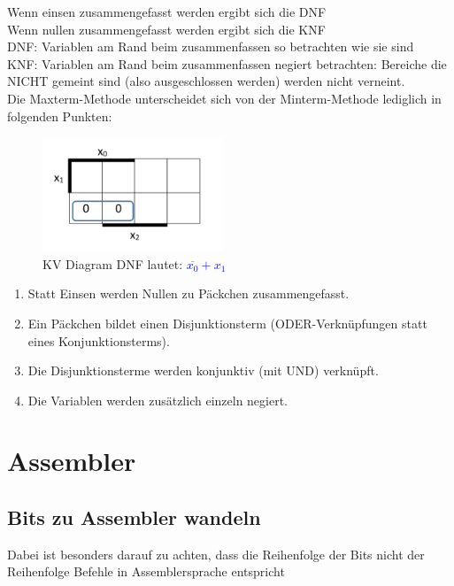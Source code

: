 \documentclass[a4paper]{article}
\begin{document}
		Wenn einsen zusammengefasst werden ergibt sich die DNF\\
		Wenn nullen zusammengefasst werden ergibt sich die KNF\\
		DNF: Variablen am Rand beim zusammenfassen so betrachten wie sie sind\\
		KNF: Variablen am Rand beim zusammenfassen negiert betrachten: Bereiche die NICHT gemeint sind (also ausgeschlossen werden) werden nicht verneint.\\
		Die Maxterm-Methode unterscheidet sich von der Minterm-Methode lediglich in folgenden Punkten:
		\begin{figure}
			\vspace{-20pt}
			\begin{center}
				\includegraphics[width=0.48\textwidth]{kv-KNF.png}
			\end{center}
			\vspace{-20pt}
			\caption{KV Diagram DNF lautet: \textcolor{blue}{$\overline{x_0}+x_1$}}
			\vspace{-20pt}
		\end{figure}

		\begin{enumerate}
			\item Statt Einsen werden Nullen zu Päckchen zusammengefasst.
			\item Ein Päckchen bildet einen Disjunktionsterm (ODER-Verknüpfungen statt eines Konjunktionsterms).
			\item Die Disjunktionsterme werden konjunktiv (mit UND) verknüpft.
			\item Die Variablen werden zusätzlich einzeln negiert.
		\end{enumerate}

\section{Assembler}
	\subsection{Bits zu Assembler wandeln}
		Dabei ist besonders darauf zu achten, dass die Reihenfolge der Bits nicht der Reihenfolge Befehle in Assemblersprache entspricht
\end{document}
